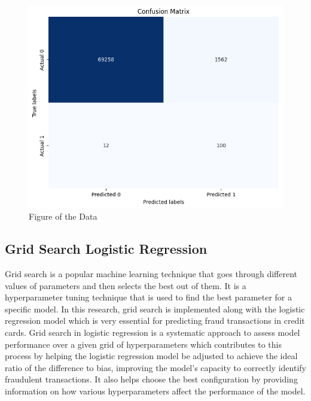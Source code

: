 \begin{figure}[ht]
    \centering
    \includegraphics[scale=0.7]{figures/CM_LogisticRegression.png}
    \caption{Figure of the Data}
    \label{fig:Plot of the Data}
\end{figure}



\subsection{Grid Search Logistic Regression}

Grid search is a popular machine learning technique that goes through different values of parameters and then selects the best out of them. It is a hyperparameter tuning technique that is used to find the best parameter for a specific model. In this research, grid search is implemented along with the logistic regression model which is very essential for predicting fraud transactions in credit cards. Grid search in logistic regression is a systematic approach to assess model performance over a given grid of hyperparameters which contributes to this process by helping the logistic regression model be adjusted to achieve the ideal ratio of the difference to bias, improving the model's capacity to correctly identify fraudulent transactions. It also helps choose the best configuration by providing information on how various hyperparameters affect the performance of the model. 

